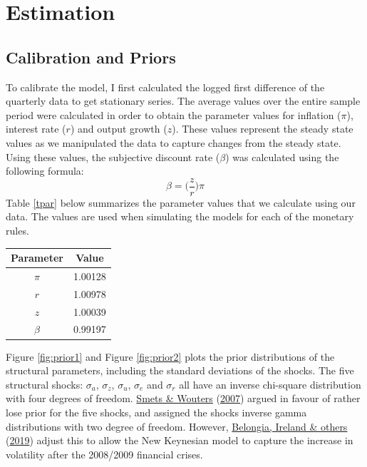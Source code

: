 \documentclass[11pt,preprint, authoryear]{elsarticle}
\let\origtable\table
\let\endorigtable\endtable
\renewenvironment{table}[1][2] {
    \expandafter\origtable\expandafter[H]
} {
    \endorigtable
}
\numberwithin{equation}{section}
\numberwithin{figure}{section}
\numberwithin{table}{section}
\begin{document}
\hypertarget{estimation}{%
\section{Estimation}\label{estimation}}

\hypertarget{calibration-and-priors}{%
\subsection{Calibration and Priors}\label{calibration-and-priors}}

To calibrate the model, I first calculated the logged first difference
of the quarterly data to get stationary series. The average values over
the entire sample period were calculated in order to obtain the
parameter values for inflation (\(\pi\)), interest rate (\(r\)) and
output growth (\(z\)). These values represent the steady state values as
we manipulated the data to capture changes from the steady state. Using
these values, the subjective discount rate (\(\beta\)) was calculated
using the following formula: \[ \beta = \Biggl(\frac{z}{r}\Biggl)\pi\]
Table \ref{tpar} below summarizes the parameter values that we calculate
using our data. The values are used when simulating the models for each
of the monetary rules.

\begin{table} 
\caption{Parameters calculater using own data}
\begin{center}
\begin{tabular}{ |c|c| } 
 \hline
 Parameter & Value \\ 
 \hline
 \(\pi\)& 1.00128 \\ 
  \(r\)& 1.00978  \\ 
  \(z\) & 1.00039 \\
  \(\beta\) & 0.99197 \\
 \hline
\end{tabular}
\label{tpar}
\end{center}
\end{table}

Figure \ref{fig:prior1} and Figure \ref{fig:prior2} plots the prior
distributions of the structural parameters, including the standard
deviations of the shocks. The five structural shocks: \(\sigma_a\),
\(\sigma_z\), \(\sigma_u\), \(\sigma_e\) and \(\sigma_r\) all have an
inverse chi-square distribution with four degrees of freedom.
\protect\hyperlink{ref-smets}{Smets \& Wouters}
(\protect\hyperlink{ref-smets}{2007}) argued in favour of rather lose
prior for the five shocks, and assigned the shocks inverse gamma
distributions with two degree of freedom. However,
\protect\hyperlink{ref-belongia2019reconsideration}{Belongia, Ireland \&
others} (\protect\hyperlink{ref-belongia2019reconsideration}{2019})
adjust this to allow the New Keynesian model to capture the increase in
volatility after the 2008/2009 financial crises.
\end{document}
